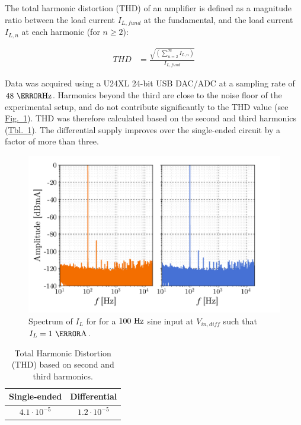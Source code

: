 \documentclass[10pt]{article}
\newcommand{\brieftbllink}[1]{\hyperref[#1]{Tbl.~\ref*{#1}}\xspace }
\newcommand{\brieffiglink}[1]{\hyperref[#1]{Fig.~\ref*{#1}}}
\begin{document}
The total harmonic distortion (THD) of an amplifier is defined as a magnitude ratio between the load current $I_{L,fund}$ at the fundamental, and the load current $I_{L,n}$ at each harmonic (for $n\geq 2$):

\begin{align*}
THD &= \frac{\sqrt{\left(\sum_{n=2}^\infty I_{L,n} \right)}}{I_{L,fund}}
\end{align*}

Data was acquired using a U24XL 24-bit USB DAC/ADC at a sampling rate of $48~\kilo\hertz$. Harmonics beyond the third are close to the noise floor of the experimental setup, and do not contribute significantly to the THD value (see \brieffiglink{fig:output_current_spectrum}). THD was therefore calculated based on the second and third harmonics (\brieftbllink{tbl:thd}). The differential supply improves over the single-ended circuit by a factor of more than three.

\begin{figure}[t!]
	\centering
    \includegraphics[scale=.6]{spectral_analysis.pdf}
	\caption{\small Spectrum of $I_L$ for for a $100~\hertz$ sine input at $V_{in,diff}$ such that $I_L=1~\milli\ampere$.}
	\label{fig:output_current_spectrum}
\end{figure}

\begin{table}[b!]
\centering
\bgroup
\def\arraystretch{1.3}
\begin{tabularx}{.39\textwidth}{ c|c }
Single-ended & Differential  \\
\hline
\cellcolor{gray!4} $4.1\cdot{}10^{-5}$ & \cellcolor{gray!4} $1.2\cdot{}10^{-5}$ \\
\end{tabularx}\egroup
\caption{Total Harmonic Distortion (THD) based on second and third harmonics.}
\label{tbl:thd}
\end{table}
\end{document}
